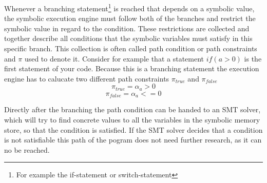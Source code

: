 Whenever a branching statement\footnote{For example the if-statement or switch-statement} is reached that depends on a symbolic value, the symbolic execution engine must follow both of the branches and restrict the symbolic value in regard to the condition. These restrictions are collected and together describe all conditions that the symbolic variables must satisfy in this specific branch. This collection is often called path condition or path constraints and $\pi$ used to denote it\cite{SurveySymExec-CSUR18}.
Consider for example that a statement $if (a > 0)$ is the first statement of your code. Because this is a branching statement the execution engine has to calucate two different path constraints $\pi_{true}$ and $\pi_{false}$
$$\pi_{true} = \alpha_a > 0$$
$$\pi_{false} = \alpha_a <= 0$$

Directly after the branching the path condition can be handed to an SMT solver, which will try to find concrete values to all the variables in the symbolic memory store, so that the condition is satisfied. If the SMT solver decides that a condition is not satisfiable this path of the pogram does not need further research, as it can no be reached.
